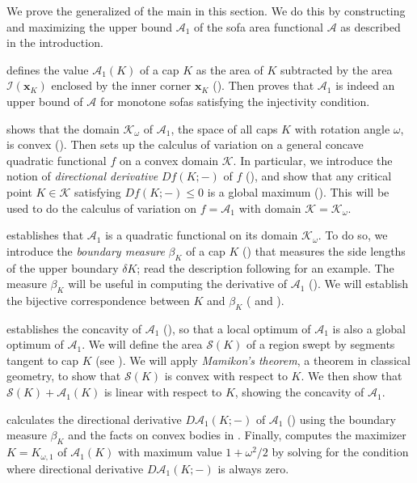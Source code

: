We prove the generalized  of the main  in this section. We do this by constructing and maximizing the upper bound \(\mathcal{A}_1\) of the sofa area functional \(\mathcal{A}\) as described in the introduction.

 defines the value \(\mathcal{A}_1(K)\) of a cap \(K\) as the area of \(K\) subtracted by the area \(\mathcal{I}(\mathbf{x}_K)\) enclosed by the inner corner \(\mathbf{x}_K\) (). Then  proves that \(\mathcal{A}_1\) is indeed an upper bound of \(\mathcal{A}\) for monotone sofas satisfying the injectivity condition.

 shows that the domain \(\mathcal{K}_\omega\) of \(\mathcal{A}_1\), the space of all caps \(K\) with rotation angle \(\omega\), is convex (). Then  sets up the calculus of variation on a general concave quadratic functional \(f\) on a convex domain \(\mathcal{K}\). In particular, we introduce the notion of \emph{directional derivative} \(Df(K; -)\) of \(f\) (), and show that any critical point \(K \in \mathcal{K}\) satisfying \(D f(K; -) \leq 0\) is a global maximum (). This will be used to do the calculus of variation on \(f = \mathcal{A}_1\) with domain \(\mathcal{K} = \mathcal{K}_\omega\).

 establishes that \(\mathcal{A}_1\) is a quadratic functional on its domain \(\mathcal{K}_\omega\). To do so, we introduce the \emph{boundary measure} \(\beta_K\) of a cap \(K\) () that measures the side lengths of the upper boundary \(\delta K\); read the description following  for an example. The measure \(\beta_K\) will be useful in computing the derivative of \(\mathcal{A}_1\) (). We will establish the bijective correspondence between \(K\) and \(\beta_K\) ( and ).

 establishes the concavity of \(\mathcal{A}_1\) (), so that a local optimum of \(\mathcal{A}_1\) is also a global optimum of \(\mathcal{A}_1\). We will define the area \(\mathcal{S}(K)\) of a region swept by segments tangent to cap \(K\) (see ). We will apply \emph{Mamikon’s theorem}, a theorem in classical geometry, to show that \(\mathcal{S}(K)\) is convex with respect to \(K\). We then show that \(\mathcal{S}(K) + \mathcal{A}_1(K)\) is linear with respect to \(K\), showing the concavity of \(\mathcal{A}_1\).

 calculates the directional derivative \(D\mathcal{A}_1(K; -)\) of \(\mathcal{A}_1\) () using the boundary measure \(\beta_K\) and the facts on convex bodies in . Finally,  computes the maximizer \(K = K_{\omega, 1}\) of \(\mathcal{A}_1(K)\) with maximum value \(1 + \omega^2/2\) by solving for the condition where directional derivative \(D\mathcal{A}_1(K; -)\) is always zero.